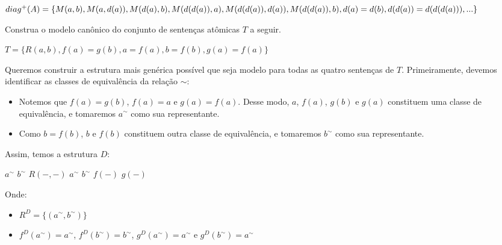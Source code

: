 \begin{rexercises}
\begin{question}
\begin{resolution}
            $diag^+(A) = \{M(a, b), M(a, d(a)), M(d(a), b), M(d(d(a)), a), M(d(d(a)), d(a)),\\ M(d(d(a)), b), d(a) = d(b), d(d(a)) = d(d(d(a))), ...\}$
        \end{resolution}
    \end{question}

    \begin{question}
        Construa o modelo canônico do conjunto de sentenças atômicas $T$ a seguir.
        \begin{center}
            $T = \{R(a, b), f(a) = g(b), a = f(a), b = f(b), g(a) = f(a)\}$
        \end{center}
        \begin{resolution}
            Queremos construir a estrutura mais genérica possível que seja modelo para todas as quatro sentenças de $T$. Primeiramente, devemos identificar as classes de equivalência da relação $\sim$:
            \begin{itemize}
                \item Notemos que $f(a) = g(b)$, $f(a) = a$ e $g(a) = f(a)$. Desse modo, $a$, $f(a)$, $g(b)$ e $g(a)$ constituem uma classe de equivalência, e tomaremos $a^\sim$ como sua representante.
                \item Como $b = f(b)$, $b$ e $f(b)$ constituem outra classe de equivalência, e tomaremos $b^\sim$ como sua representante. 
            \end{itemize}
            Assim, temos a estrutura $D$:

            \begin{center}
                \begin{structure}
                    {}
                    {$a^\sim$ $b^\sim$}
                    {$R(-,-)$}
                    {$a^\sim$ $b^\sim$}
                    {$f(-)$ $g(-)$}
                \end{structure}
            \end{center}

            Onde:
            \begin{itemize}
                \item [] $R^D = \{(a^\sim, b^\sim)\}$
                \item [] $f^D(a^\sim) = a^\sim$, $f^D(b^\sim) = b^\sim$, $g^D(a^\sim) = a^\sim$ e $g^D(b^\sim) = a^\sim$
            \end{itemize}
        \end{resolution}
    \end{question}
\end{rexercises}

